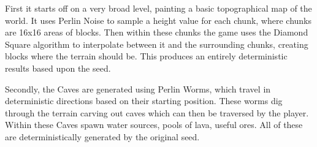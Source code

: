 \begin{flushleft}
                    \vspace{0.2cm}

                    First it starts off on a very broad level, painting a basic topographical map of the world. It uses Perlin Noise to sample
                    a height value for each chunk, where chunks are 16x16 areas of blocks. Then within these chunks the game uses the Diamond Square
                    algorithm to interpolate between it and the surrounding chunks, creating blocks where the terrain should be. This produces an 
                    entirely deterministic results based upon the seed.\\

                    \vspace{0.2cm}

                    Secondly, the Caves are generated using Perlin Worms, which travel in deterministic directions based on their starting position.
                    These worms dig through the terrain carving out caves which can then be traversed by the player. Within these Caves spawn water
                    sources, pools of lava, useful ores. All of these are deterministically generated by the original seed. \\ 


                    \begin{figure}[h]
                        \centering
                        \qquad
                    \end{figure}


\end{flushleft}
